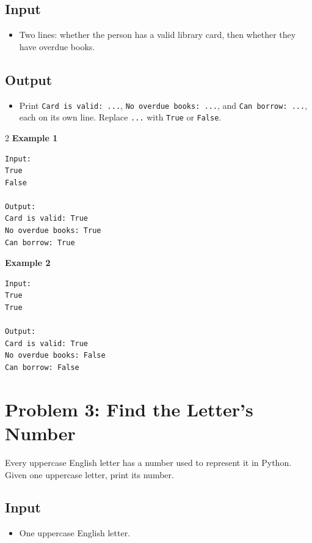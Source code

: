 \documentclass[12pt,oneside,openany]{article}
\begin{document}
\subsection*{Input}
\begin{itemize}
    \item Two lines: whether the person has a valid library card, then whether they have overdue books.
\end{itemize}

\subsection*{Output}
\begin{itemize}
    \item Print \texttt{Card is valid: ...}, \texttt{No overdue books: ...}, and \texttt{Can borrow: ...}, each on its own line. Replace \texttt{...} with \texttt{True} or \texttt{False}.
\end{itemize}

\vspace{0.2cm}

\begin{example*}{}{}
\begin{multicols}{2}
\textbf{Example 1}
\begin{verbatim}
Input:
True
False

Output:
Card is valid: True
No overdue books: True
Can borrow: True
\end{verbatim}
\textbf{Example 2}
\begin{verbatim}
Input:
True
True

Output:
Card is valid: True
No overdue books: False
Can borrow: False
\end{verbatim}
\end{multicols}
\end{example*}
\newpage
\section*{Problem 3: Find the Letter's Number}

Every uppercase English letter has a number used to represent it in Python. Given one uppercase letter, print its number.

\subsection*{Input}
\begin{itemize}
    \item One uppercase English letter.
\end{itemize}
\end{document}
